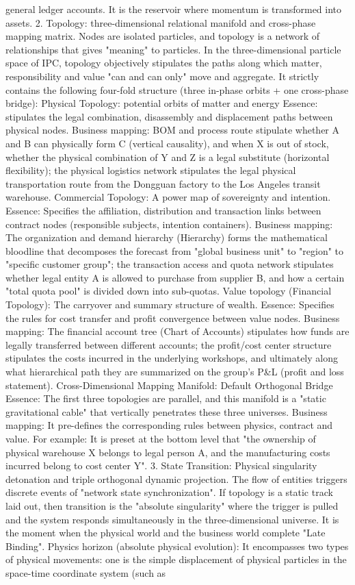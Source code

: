 \documentclass[11pt,a4paper]{article}
\begin{document}
general ledger accounts. It is the reservoir where momentum is transformed into assets. 2. Topology: three-dimensional relational manifold and cross-phase mapping matrix. Nodes are isolated particles, and topology is a network of relationships that gives "meaning" to particles. In the three-dimensional particle space of IPC, topology objectively stipulates the paths along which matter, responsibility and value "can and can only" move and aggregate. It strictly contains the following four-fold structure (three in-phase orbits + one cross-phase bridge): Physical Topology: potential orbits of matter and energy Essence: stipulates the legal combination, disassembly and displacement paths between physical nodes. Business mapping: BOM and process route stipulate whether A and B can physically form C (vertical causality), and when X is out of stock, whether the physical combination of Y and Z is a legal substitute (horizontal flexibility); the physical logistics network stipulates the legal physical transportation route from the Dongguan factory to the Los Angeles transit warehouse. Commercial Topology: A power map of sovereignty and intention. Essence: Specifies the affiliation, distribution and transaction links between contract nodes (responsible subjects, intention containers). Business mapping: The organization and demand hierarchy (Hierarchy) forms the mathematical bloodline that decomposes the forecast from "global business unit" to "region" to "specific customer group"; the transaction access and quota network stipulates whether legal entity A is allowed to purchase from supplier B, and how a certain "total quota pool" is divided down into sub-quotas. Value topology (Financial Topology): The carryover and summary structure of wealth. Essence: Specifies the rules for cost transfer and profit convergence between value nodes. Business mapping: The financial account tree (Chart of Accounts) stipulates how funds are legally transferred between different accounts; the profit/cost center structure stipulates the costs incurred in the underlying workshops, and ultimately along what hierarchical path they are summarized on the group's P\&L (profit and loss statement). Cross-Dimensional Mapping Manifold: Default Orthogonal Bridge Essence: The first three topologies are parallel, and this manifold is a "static gravitational cable" that vertically penetrates these three universes. Business mapping: It pre-defines the corresponding rules between physics, contract and value. For example: It is preset at the bottom level that "the ownership of physical warehouse X belongs to legal person A, and the manufacturing costs incurred belong to cost center Y". 3. State Transition: Physical singularity detonation and triple orthogonal dynamic projection. The flow of entities triggers discrete events of "network state synchronization". If topology is a static track laid out, then transition is the "absolute singularity" where the trigger is pulled and the system responds simultaneously in the three-dimensional universe. It is the moment when the physical world and the business world complete "Late Binding". Physics horizon (absolute physical evolution): It encompasses two types of physical movements: one is the simple displacement of physical particles in the space-time coordinate system (such as 
\end{document}
